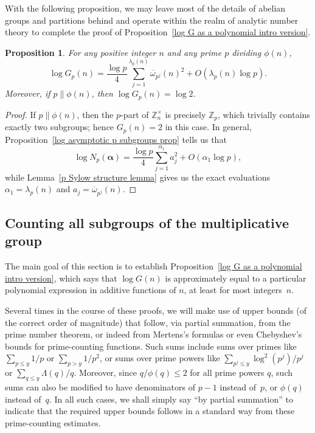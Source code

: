 \documentclass[12pt,reqno]{amsart}
\newtheorem{prop}[theorem]{Proposition}
\theoremstyle{definition}
\newcommand{\ovomega}{{\overline\omega}}
\newcommand{\Z}{{\mathbb Z}}
\newcommand{\Znt}{{\Z_n^\times}}
\newcommand{\balpha}{{\bm\alpha}}
\begin{document}
With the following proposition, we may leave most of the details of abelian groups and partitions behind and operate within the realm of analytic number theory to complete the proof of Proposition~\ref{log G as a polynomial intro version}.

\begin{prop}  \label{gpn as a polynomial}
\label{translating to Wn lemma}
For any positive integer $n$ and any prime $p$ dividing $\phi(n)$,
\[
\log G_p(n) = \frac{\log p}4 \sum_{j=1}^{\lambda_p(n)} \ovomega_{p^j}(n)^2 + O(\lambda_p(n) \log p).
\]
Moreover, if $p \parallel \phi(n)$, then $\log G_p(n) = \log 2$.
\end{prop}

\begin{proof}
If $p \parallel \phi(n)$, then the $p$-part of $\Znt$ is precisely $\Z_p$, which trivially contains exactly two subgroups; hence $G_p(n) = 2$ in this case. In general, Proposition~\ref{log asymptotic p subgroups prop} tells us that
\[
\log N_p(\balpha) = \frac{\log p}4 \sum_{j=1}^{\alpha_1} a_j^2 + O(\alpha_1\log p),
\]
while Lemma~\ref{p Sylow structure lemma} gives us the exact evaluations $\alpha_1=\lambda_p(n)$ and $a_j = \ovomega_{p^j}(n)$.
\end{proof}


\subsection{Counting all subgroups of the multiplicative group}

The main goal of this section is to establish Proposition~\ref{log G as a polynomial intro version}, which says that $\log G(n)$ is approximately equal to a particular polynomial expression in additive functions of $n$, at least for most integers~$n$.

Several times in the course of these proofs, we will make use of upper bounds (of the correct order of magnitude) that follow, via partial summation, from the prime number theorem, or indeed from Mertens's formulas or even Chebyshev's bounds for prime-counting functions. Such sums include sums over primes like $\sum_{p\le y} 1/p$ or $\sum_{p>y} 1/p^2$, or sums over prime powers like $\sum_{p^j \le y} \log^2(p^j)/p^j$ or $\sum_{q\le y} \Lambda(q)/q$. Moreover, since $q/\phi(q) \le 2$ for all prime powers $q$, such sums can also be modified to have denominators of $p-1$ instead of~$p$, or $\phi(q)$ instead of~$q$. In all such cases, we shall simply say ``by partial summation'' to indicate that the required upper bounds follows in a standard way from these prime-counting estimates.
\end{document}
